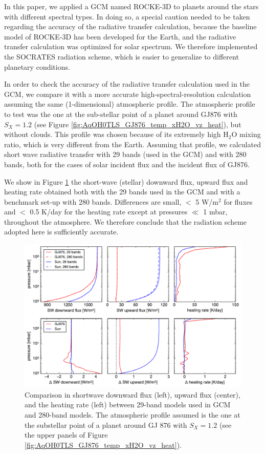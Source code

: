\documentclass[11pt,numberedappendix,twocolappendix,]{emulateapj}
\def\water{H$_2$O }
\begin{document}
In this paper, we applied a GCM named ROCKE-3D to planets around the stars with different spectral types. 
In doing so, a special caution needed to be taken regarding the accuracy of the radiative transfer calculation, because the baseline model of ROCKE-3D has been developed for the Earth, and the radiative transfer calculation was optimized for solar spectrum. 
We therefore implemented the SOCRATES radiation scheme, which is easier to generalize to different planetary conditions.

In order to check the accuracy of the radiative transfer calculation used in the GCM, we compare it with a more accurate high-spectral-resolution calculation assuming the same (1-dimensional) atmospheric profile. 
The atmospheric profile to test was the one at the sub-stellar point of a planet around GJ876 with $S_X=1.2$ (see Figure \ref{fig:AqOH0TLS_GJ876_temp_xH2O_vz_heat}), but without clouds. 
This profile was chosen because of its extremely high \water mixing ratio, which is very different from the Earth. 
Assuming that profile, we calculated short wave radiative transfer with 29 bands (used in the GCM) and with 280 bands, both for the cases of solar incident flux and the incident flux of GJ876. 

We show in Figure \ref{fig:socrates} the short-wave (stellar) downward flux, upward flux and heating rate obtained both with the 29 bands used in the GCM and with a benchmark set-up with 280 bands. Differences are small, $<$ 5 W/m$^2$ for fluxes and $<$ 0.5 K/day for the heating rate except at pressures $\ll$ 1 mbar, throughout the atmosphere. We therefore conclude that the radiation scheme adopted here is sufficiently accurate.

\begin{figure}[!htb]
    \begin{center}
    \includegraphics[width=0.8\hsize]{fig/rad_comparison_SW29-SW280_AqOH0TLS_GJ876S12P20L40Q.pdf}
    \end{center}
\caption{Comparison in shortwave downward flux (left), upward flux (center), and the heating rate (left) between 29-band models used in GCM and 280-band models. The atmospheric profile assumed is the one at the substellar point of a planet around GJ 876 with $S_X=1.2$ (see the upper panels of Figure \ref{fig:AqOH0TLS_GJ876_temp_xH2O_vz_heat}). }
\label{fig:socrates}
\end{figure}
\end{document}
